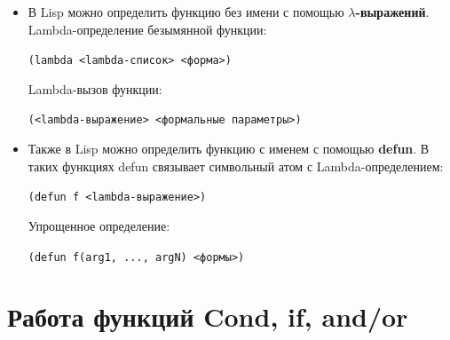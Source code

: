 \documentclass[a4paper,14pt, unknownkeysallowed]{extreport}
\begin{document}
\begin{itemize}
	\item В Lisp можно определить функцию без имени с помощью \textbf{$\lambda$-выражений}. 
	Lambda-определение безымянной функции:
	
	\begin{center}
	\texttt{(lambda <lambda-список> <форма>)}
	\end{center}

	Lambda-вызов функции:

	\begin{center}
	\texttt{(<lambda-выражение> <формальные параметры>)}
	\end{center}

	\item Также в Lisp можно определить функцию с именем с помощью \textbf{defun}. В таких функциях defun связывает символьный атом с Lambda-определением:
	
	\begin{center}
	\texttt{(defun f <lambda-выражение>)}
	\end{center}

	Упрощенное определение:

	\begin{center}
	\texttt{(defun f(arg1, ..., argN) <формы>)}
	\end{center}

\end{itemize}

\section{Работа функций Cond, if, and/or}
\end{document}
